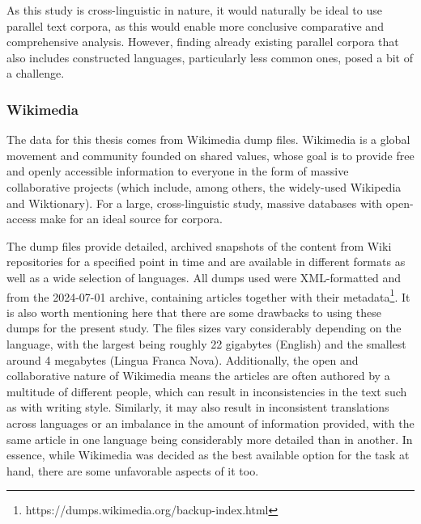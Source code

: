 \documentclass[12pt,a4paper]{article}
\numberwithin{figure}{section}
\numberwithin{table}{section}
\numberwithin{definition}{section}
\begin{document}
As this study is cross-linguistic in nature, it would naturally be ideal to use parallel text corpora, as this would enable more conclusive comparative and comprehensive analysis. However, finding already existing parallel corpora that also includes constructed languages, particularly less common ones, posed a bit of a challenge. 



\subsubsection{Wikimedia}
\label{sec:wikimedia}


The data for this thesis comes from Wikimedia dump files. Wikimedia is a global movement and community founded on shared values, whose goal is to provide free and openly accessible information to everyone in the form of massive collaborative projects (which include, among others, the widely-used Wikipedia and Wiktionary). For a large, cross-linguistic study, massive databases with open-access make for an ideal source for corpora.

The dump files provide detailed, archived snapshots of the content from Wiki repositories for a specified point in time and are available in different formats as well as a wide selection of languages. All dumps used were XML-formatted and from the 2024-07-01 archive, containing articles together with their metadata\footnote{https://dumps.wikimedia.org/backup-index.html}. It is also worth mentioning here that there are some drawbacks to using these dumps for the present study. The files sizes vary considerably depending on the language, with the largest being roughly 22 gigabytes (English) and the smallest around 4 megabytes (Lingua Franca Nova). Additionally, the open and collaborative nature of Wikimedia means the articles are often authored by a multitude of different people, which can result in inconsistencies in the text such as with writing style. Similarly, it may also result in inconsistent translations across languages or an imbalance in the amount of information provided, with the same article in one language being considerably more detailed than in another. In essence, while Wikimedia was decided as the best available option for the task at hand, there are some unfavorable aspects of it too.
\end{document}
